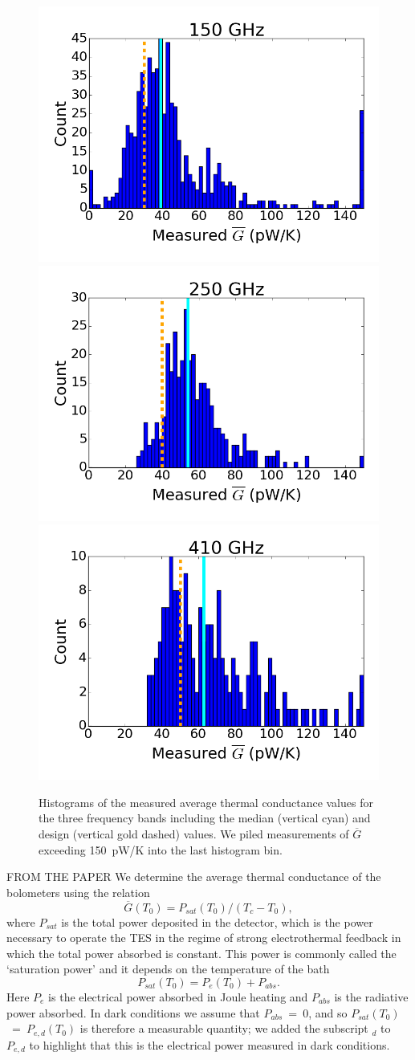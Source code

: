 \begin{figure}[ht!]
\centering
\includegraphics[width=0.31\columnwidth]{figures/150_g_bar_hist.png}
\includegraphics[width=0.31\columnwidth]{figures/250_g_bar_hist.png}
\includegraphics[width=0.31\columnwidth]{figures/410_g_bar_hist.png}
\caption{Histograms of the measured average thermal conductance values for the three frequency bands including the 
median (vertical cyan) and design (vertical gold dashed) values. 
We piled measurements of  $\overline{G}$ exceeding 150~pW/K into the last histogram bin.
}
\label{fig:G_Histograms} 
\end{figure}


FROM THE PAPER
We determine the average thermal conductance of the bolometers using the relation
\begin{equation}
 \overline{G}(T_{0}) = P_{sat}(T_0)/ (T_{c} - T_{0}),
\label{eqn:gbar}
\end{equation}
where $P_{sat}$ is the total power deposited in the detector, which is the power necessary to operate the \ac{TES} in the regime of strong electrothermal feedback in which the total power absorbed is constant.
This power is commonly called the `saturation power' and it depends on the temperature of the bath
\begin{equation}
P_{sat}(T_{0}) = P_{e} (T_{0}) + P_{abs}. 
\label{eqn:boloPowerFlow}
\end{equation}
Here $P_{e}$ is the electrical power absorbed in Joule heating and $P_{abs}$ is the radiative power absorbed.
In dark conditions we assume that $P_{abs}$~=~0, and so $P_{sat}(T_{0})$~=~$P_{e,d}(T_{0})$ is 
therefore a measurable quantity; we added the subscript $_{d}$ to $P_{e,d}$ to highlight that this is the electrical 
power measured in dark conditions. 

